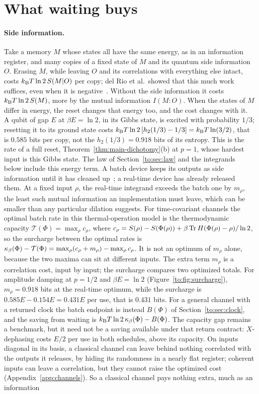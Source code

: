 \section{What waiting buys}\label{to:sec:waiting}

\paragraph{Side information.} Take a memory $M$ whose states all have the same energy, as in an information register, and many copies of a fixed state of $M$ and its quantum side information $O$. Erasing $M$, while leaving $O$ and its correlations with everything else intact, costs $k_{\mathrm B} T\ln2\,S(M|O)$ per copy; del Rio et al.\ showed that this much work suffices, even when it is negative~\cite{delRio11}. Without the side information it costs $k_{\mathrm B} T\ln2\,S(M)$, more by the mutual information $I(M{:}O)$. When the states of $M$ differ in energy, the reset changes that energy too, and the cost changes with it. A qubit of gap $E$ at $\beta E=\ln2$, in its Gibbs state, is excited with probability $1/3$; resetting it to its ground state costs $k_{\mathrm B} T\ln2\,[h_2(1/3)-1/3]=k_{\mathrm B} T\ln(3/2)$, that is $0.585$ bits per copy, not the $h_2(1/3)=0.918$ bits of its entropy. This is the rate of a full reset, Theorem~\ref{thm:main-dichotomy}(b) at $p=1$, whose hardest input is this Gibbs state. The law of Section~\ref{to:sec:law} and the integrands below include this energy term. A batch device keeps its outputs as side information until it has cleaned up~\cite[Sec.~7]{FBB21}; a real-time device has already released them. At a fixed input $\rho$, the real-time integrand exceeds the batch one by $m_\rho$, the least such mutual information an implementation must leave, which can be smaller than any particular dilation suggests. For time-covariant channels the optimal batch rate in this thermal-operation model is the thermodynamic capacity $\mathcal T(\Phi)=\max_\rho c_\rho$, where $c_\rho=S(\rho)-S(\Phi(\rho))+\beta\operatorname{Tr} H(\Phi(\rho)-\rho)/\ln2$, so the surcharge between the optimal rates is $\kappa_\beta(\Phi)-\mathcal T(\Phi)=\max_\rho(c_\rho+m_\rho)-\max_\rho c_\rho$. It is not an optimum of $m_\rho$ alone, because the two maxima can sit at different inputs. The extra term $m_\rho$ is a correlation cost, input by input; the surcharge compares two optimized totals. For amplitude damping at $p=1/2$ and $\beta E=\ln2$ (Figure~\ref{to:fig:surcharge}), $m_\rho=0.918$ bits at the real-time optimum, while the surcharge is $0.585E-0.154E=0.431E$ per use, that is $0.431$ bits. For a general channel with a returned clock the batch endpoint is instead $B(\Phi)$ of Section~\ref{to:sec:clock}, and the saving from waiting is $k_{\mathrm B} T\ln2\,\kappa_\beta(\Phi)-B(\Phi)$. The capacity gap remains a benchmark, but it need not be a saving available under that return contract: $X$-dephasing costs $E/2$ per use in both schedules, above its capacity. On inputs diagonal in its basis, a classical channel can leave behind nothing correlated with the outputs it releases, by hiding its randomness in a nearly flat register; coherent inputs can leave a correlation, but they cannot raise the optimized cost (Appendix~\ref{app:channels}). So a classical channel pays nothing extra, much as an information 